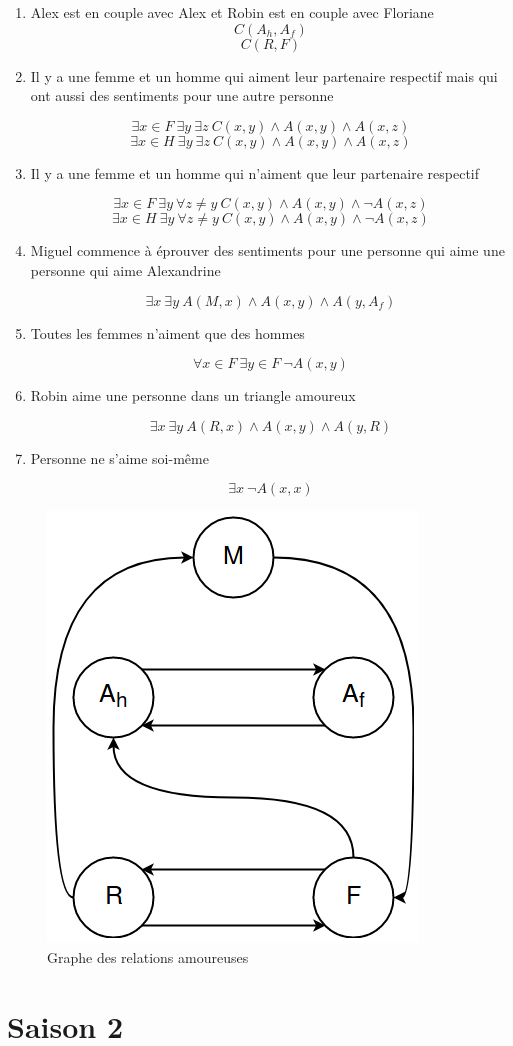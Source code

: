 \documentclass[12pt,a4paper,oneside]{article}
\begin{document}
		\begin{enumerate}
			\item Alex est en couple avec Alex et Robin est en couple avec Floriane
				$$C(A_{h}, A_{f})$$
				$$C(R, F)$$

			\item Il y a une femme et un homme qui aiment leur partenaire respectif mais qui ont aussi des sentiments pour une autre personne

				$$\exists x \in F\ \exists y\ \exists z\ C(x, y) \wedge A(x, y) \wedge A(x, z)$$
				$$\exists x \in H\ \exists y\ \exists z\ C(x, y) \wedge A(x, y) \wedge A(x, z)$$

			\item Il y a une femme et un homme qui n’aiment que leur partenaire respectif

				$$\exists x \in F\ \exists y\ \forall  z\neq y\ C(x, y) \wedge A(x, y) \wedge \neg A(x, z)$$
				$$\exists x \in H\ \exists y\ \forall z\neq y\ C(x, y) \wedge A(x, y) \wedge \neg A(x, z)$$

			\item Miguel commence à éprouver des sentiments pour une personne qui aime une personne qui aime Alexandrine

				$$\exists x\ \exists y\ A(M, x) \wedge A(x, y) \wedge A(y, A_{f})$$

			\item Toutes les femmes n’aiment que des hommes

				$$\forall x \in F\ \exists y \in F\ \neg A(x, y)$$

			\item Robin aime une personne dans un triangle amoureux

				$$\exists x\ \exists y\ A(R, x) \wedge A(x,y) \wedge A(y, R)$$

			\item Personne ne s’aime soi-même

				$$\exists x\ \neg A(x, x)$$

		\end{enumerate}

		\begin{figure}[h]
			\includegraphics[scale = 0.7]{ex1.png}
			\centering
			\caption{Graphe des relations amoureuses}
		\end{figure}

		\section{Saison 2}
\end{document}
